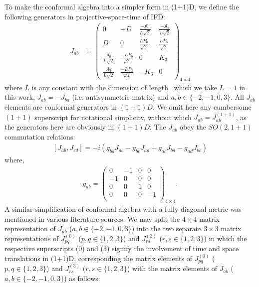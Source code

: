 \documentclass[%
 reprint,
superscriptaddress,
 amsmath,amssymb,
 aps,
]{revtex4-2}
\begin{document}
To make the conformal algebra into a simpler form in (1+1)D, we define the following generators in projective-space-time of IFD:
\begin{align}\label{Jab}
  J_{ab}&=
  \begin{pmatrix}
  0&-D&\frac{-\mathfrak{K}_0}{L\sqrt{2}}&\frac{-\mathfrak{K}_3}{L\sqrt{2}}\\
  D&0&\frac{LP_0}{\sqrt{2}}&\frac{LP_3}{\sqrt{2}}\\
    \frac{\mathfrak{K}_0}{L\sqrt{2}}&\frac{-LP_0}{\sqrt{2}}&0  & K_{3}\\
    \frac{\mathfrak{K}_3}{L\sqrt{2}}&\frac{-LP_3}{\sqrt{2}}&-K_{3} & 0
  \end{pmatrix}_{4\times4}
\end{align}
where $L$ is any constant with the dimension of length~\cite{Fubini1976} which we take $L=1$ in this work, $J_{ab}=-J_{ba}$ (i.e. antisymmetric matrix) and $a,b\in\{-2,-1,0,3\}$. All $J_{ab}$ elements are conformal generators in $(1+1)D$. We omit here any cumbersome $(1+1)$ superscript for notational simplicity, without which $J_{ab} = J^{(1+1)}_{ab}$, as the generators here are obviously in $(1+1)D$. The $J_{ab}$ obey the $SO(2,1+1)$ commutation relations:
  \begin{align}\label{JabalgebraIFD}
      \left[J_{{a}{b}},J_{{c}{d}}\right]=-i\left(g_{{b}{d}}J_{{a}{c}}-g_{{b}{c}}J_{{a}{d}}+g_{{a}{c}}J_{{b}{d}}-g_{{a}{d}}J_{{b}{c}}\right)
  \end{align}
where, 
  \begin{align}\label{metric}
      g_{ab}=\begin{pmatrix}
  0&-1&0&0\\
  -1&0&0&0\\
  0&0&1&0\\
  0&0&0&-1\\
  \end{pmatrix}_{4\times4}.
  \end{align}
A similar simplification of conformal algebra with a fully diagonal metric was mentioned in various literature sources\cite {SalamMack1969, Francesco}. We may split the $4\times4$ matrix representation of $J_{ab}$ ($a,b\in\{-2,-1,0,3\}$) into the two separate $3\times3$ matrix representations of $J^{(0)}_{pq}$ ($p,q\in\{1,2,3\}$) and $J^{(3)}_{rs}$ ($r,s\in\{1,2,3\}$) in which the respective superscripts (0) and (3) signify the involvement of time and space translations in (1+1)D, corresponding the matrix elements of $J^{(0)}_{pq}$ ($p,q\in\{1,2,3\}$) and $J^{(3)}_{rs}$ ($r,s\in\{1,2,3\}$) with the matrix elements of $J_{ab}$ ($a,b\in\{-2,-1,0,3\}$) as follows:
\end{document}

